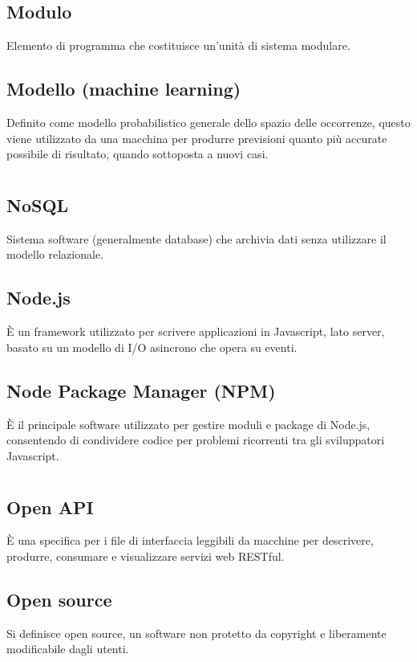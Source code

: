 	\subsection*{Modulo}
	Elemento di programma che costituisce un’unità di sistema modulare.
	\subsection*{Modello (machine learning)}
	Definito come modello probabilistico generale dello spazio delle occorrenze, questo viene utilizzato da una macchina per produrre previsioni quanto più accurate possibile di risultato, quando sottoposta a nuovi casi.
\pagebreak
\section[N]{}
	\subsection*{NoSQL}
	Sistema software (generalmente database) che archivia dati senza utilizzare il modello relazionale.
	\subsection*{Node.js}
	È un framework utilizzato per scrivere applicazioni in Javascript, lato server, basato su un modello di I/O asincrono che opera su eventi.
	\subsection*{Node Package Manager (NPM)}
	È il principale software utilizzato per gestire moduli e package di Node.js, consentendo di condividere codice per problemi ricorrenti tra gli sviluppatori Javascript.
\pagebreak
\section[O]{}
	\subsection*{Open API}
	È una specifica per i file di interfaccia leggibili da macchine per descrivere, produrre, consumare e visualizzare servizi web RESTful.
	\subsection*{Open source}
	Si definisce open source, un software non protetto da copyright e liberamente modificabile dagli utenti.
